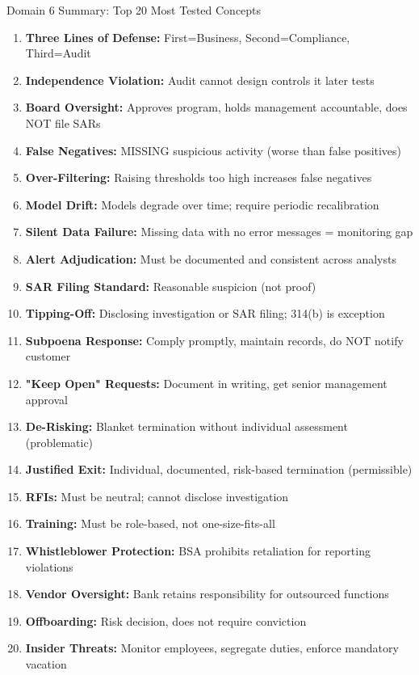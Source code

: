 \documentclass[11pt,a4paper]{beamer}
\begin{document}
	\begin{frame}{Domain 6 Summary: Top 20 Most Tested Concepts}
		\begin{enumerate}
			\item \textbf{Three Lines of Defense:} First=Business, Second=Compliance, Third=Audit
			\item \textbf{Independence Violation:} Audit cannot design controls it later tests
			\item \textbf{Board Oversight:} Approves program, holds management accountable, does NOT file SARs
			\item \textbf{False Negatives:} MISSING suspicious activity (worse than false positives)
			\item \textbf{Over-Filtering:} Raising thresholds too high increases false negatives
			\item \textbf{Model Drift:} Models degrade over time; require periodic recalibration
			\item \textbf{Silent Data Failure:} Missing data with no error messages = monitoring gap
			\item \textbf{Alert Adjudication:} Must be documented and consistent across analysts
			\item \textbf{SAR Filing Standard:} Reasonable suspicion (not proof)
			\item \textbf{Tipping-Off:} Disclosing investigation or SAR filing; 314(b) is exception
			\item \textbf{Subpoena Response:} Comply promptly, maintain records, do NOT notify customer
			\item \textbf{"Keep Open" Requests:} Document in writing, get senior management approval
			\item \textbf{De-Risking:} Blanket termination without individual assessment (problematic)
			\item \textbf{Justified Exit:} Individual, documented, risk-based termination (permissible)
			\item \textbf{RFIs:} Must be neutral; cannot disclose investigation
			\item \textbf{Training:} Must be role-based, not one-size-fits-all
			\item \textbf{Whistleblower Protection:} BSA prohibits retaliation for reporting violations
			\item \textbf{Vendor Oversight:} Bank retains responsibility for outsourced functions
			\item \textbf{Offboarding:} Risk decision, does not require conviction
			\item \textbf{Insider Threats:} Monitor employees, segregate duties, enforce mandatory vacation
		\end{enumerate}
	\end{frame}
	
\end{document}

